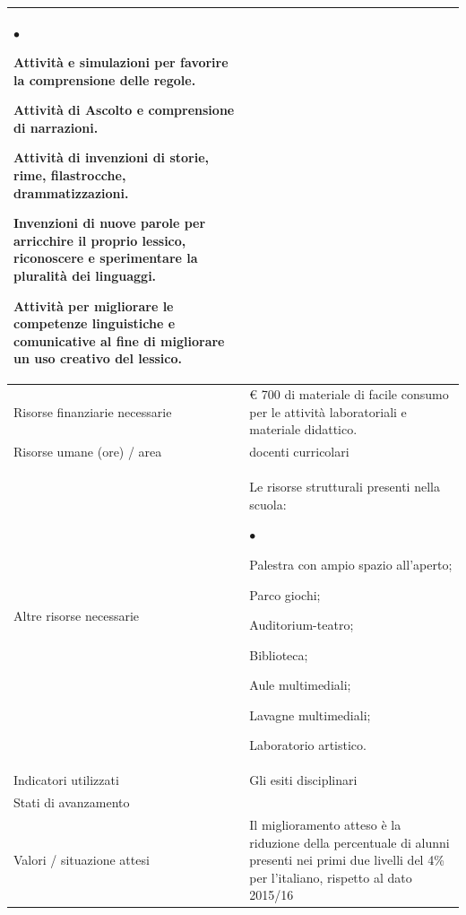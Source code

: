 \documentclass[12pt,a4paper,oneside]{memoir}
\newenvironment{elenco}{\begin{list}{$\bullet$}{%
              \setlength{\leftmargin}{4mm}%
              \setlength{\rightmargin}{1mm}%
               \setlength{\itemindent}{0mm}%
               \setlength{\labelwidth}{2mm}%
               \setlength{\labelsep}{2mm}%
              \setlength{\itemsep}{-\parsep}%
              \setlength{\partopsep}{0pt}%
              \setlength{\topsep}{0pt}%
             \setlength{\parskip}{0pt}%
              }}{\end{list}}
\begin{document}
\begin{footnotesize}
\begin{longtable}{|>{\raggedright}p{2.5cm}|>{\raggedright\arraybackslash}P{10cm}|}
\begin{elenco}
\item Attività e simulazioni per favorire la comprensione delle regole.
\item Attività di Ascolto e comprensione di narrazioni.
\item Attività di invenzioni di storie, rime, filastrocche, drammatizzazioni.
\item Invenzioni di nuove parole per arricchire il proprio lessico, riconoscere e sperimentare la pluralità dei linguaggi.
\item Attività per migliorare le competenze linguistiche e comunicative al fine di migliorare un uso creativo del lessico.
\end{elenco} \\[-4mm] \hline 
Risorse finanziarie necessarie&€ 700 di materiale di facile consumo per le attività laboratoriali e materiale didattico.\\ \hline 
Risorse umane (ore) / area&docenti curricolari
\\ \hline 
Altre risorse necessarie&Le risorse strutturali presenti nella scuola:
\begin{elenco}
\item Palestra con ampio spazio all’aperto; 
\item Parco giochi; 
\item Auditorium-teatro;
\item Biblioteca; 
\item Aule multimediali;
\item Lavagne multimediali;
\item Laboratorio artistico.
\end{elenco}\\[-4mm] \hline 
Indicatori utilizzati &Gli esiti disciplinari \\ \hline 
Stati di avanzamento&\\ \hline 
Valori / situazione attesi&Il miglioramento atteso è la riduzione della percentuale di alunni presenti nei primi due livelli del 4\% per l'italiano, rispetto al dato 2015/16 \\ \hline 
\end{longtable}
\end{footnotesize}

\vspace{24pt}
\end{document}
